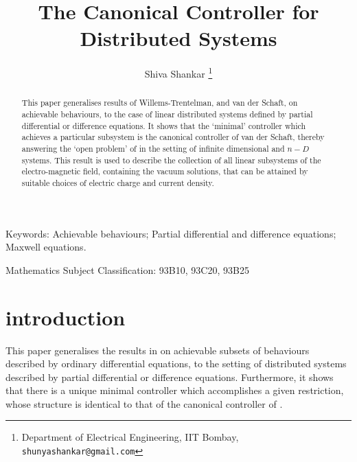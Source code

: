 \documentclass[11pt]{amsart}
\begin{document}
\title[Canonical Controller]{The Canonical Controller for Distributed Systems}


\maketitle



\begin{center}
\author{Shiva Shankar \footnote{Department of Electrical Engineering, IIT Bombay, \tt{shunyashankar@gmail.com}}}
\end{center}

\begin{abstract} This paper generalises results of Willems-Trentelman, and van der Schaft, on achievable behaviours, to the case of  linear distributed systems defined by partial differential or difference equations. It shows that the `minimal' controller which achieves a particular subsystem is the canonical controller of van der Schaft, thereby answering the `open problem' of \cite{sc} in the setting of infinite dimensional and $n-D$ systems. This result is used to describe the collection of all linear subsystems of the electro-magnetic field, containing the vacuum solutions, that can be attained by suitable choices of electric charge and current density.
\end{abstract}

{\tiny  \hspace{7mm} Keywords: Achievable behaviours; Partial differential and difference equations; Maxwell equations.}

\hspace{.7cm} {\tiny Mathematics Subject Classification: 93B10,  93C20, 93B25} 

\section{introduction}

This paper generalises the results in \cite{wt} on achievable subsets of behaviours described by ordinary differential equations, to the setting of distributed systems described by partial differential or difference equations. Furthermore, it shows that there is a unique minimal controller which accomplishes a given restriction, whose structure is identical to that of the canonical controller of \cite{sc}. 
\end{document}
